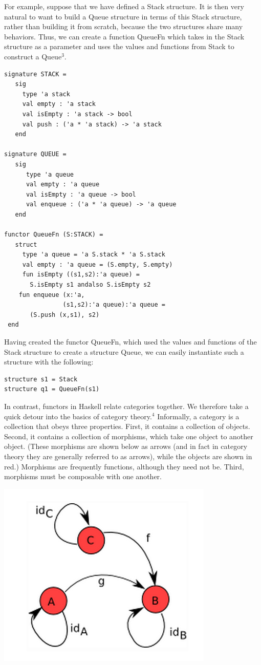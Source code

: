 \documentclass[journal]{IEEEtran}
\begin{document}
For example, suppose that we have defined a Stack structure. It is then very natural to want to build a Queue structure in terms of this Stack structure, rather than building it from scratch, because the two structures share many behaviors. Thus, we can create a function QueueFn which takes in the Stack structure as a parameter and uses the values and functions from Stack to construct a Queue$^{3}$.
\small
\begin{verbatim}
signature STACK =
   sig
     type 'a stack
     val empty : 'a stack
     val isEmpty : 'a stack -> bool
     val push : ('a * 'a stack) -> 'a stack
   end  

signature QUEUE =
   sig
      type 'a queue
      val empty : 'a queue
      val isEmpty : 'a queue -> bool
      val enqueue : ('a * 'a queue) -> 'a queue
   end

functor QueueFn (S:STACK) =
   struct
     type 'a queue = 'a S.stack * 'a S.stack
     val empty : 'a queue = (S.empty, S.empty)
     fun isEmpty ((s1,s2):'a queue) =
       S.isEmpty s1 andalso S.isEmpty s2
    fun enqueue (x:'a, 
                (s1,s2):'a queue):'a queue =
       (S.push (x,s1), s2)
 end

\end{verbatim}
\normalsize

Having created the functor QueueFn, which used the values and functions of the Stack structure to create a structure Queue, we can easily instantiate such a structure with the following:
\begin{verbatim}
structure s1 = Stack
structure q1 = QueueFn(s1)
\end{verbatim}

In contrast, functors in Haskell relate categories together. We therefore take a quick detour into the basics of category theory.$^{4}$ Informally, a category is a collection that obeys three properties. First, it contains a collection of objects. Second, it contains a collection of morphisms, which take one object to another object. (These morphisms are shown below as arrows (and in fact in category theory they are generally referred to as arrows), while the objects are shown in red.) Morphisms are frequently functions, although they need not be. Third, morphisms must be composable with one another.
\begin{center}
\includegraphics[scale=0.7]{functor.png}\\
\end{center}
\end{document}
